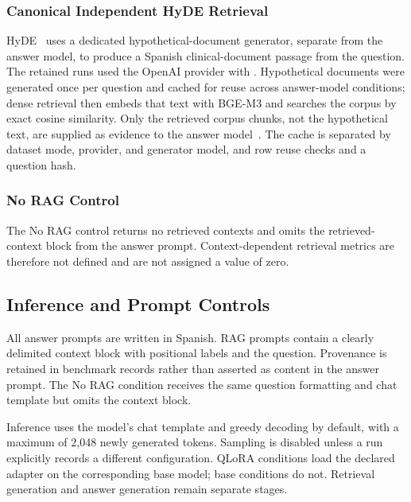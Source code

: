 \subsubsection{Canonical Independent HyDE Retrieval}
HyDE~\cite{gao2023precise} uses a dedicated hypothetical-document
generator, separate from the answer model, to produce a Spanish
clinical-document passage from the question. The retained runs used the
OpenAI provider with . Hypothetical documents
were generated once per question and cached for reuse across answer-model
conditions; dense retrieval then embeds that text with BGE-M3 and searches
the corpus by exact cosine similarity. Only the retrieved corpus chunks,
not the hypothetical text, are supplied as evidence to the answer
model~\cite{ji2023survey}. The cache is separated by dataset mode, provider,
and generator model, and row reuse checks  and a question hash.

\subsubsection{No RAG Control}
The No RAG control returns no retrieved contexts and
omits the retrieved-context block from the answer prompt. Context-dependent
retrieval metrics are therefore not defined and are not assigned a value of
zero.

\subsection{Inference and Prompt Controls}
All answer prompts are written in Spanish. RAG prompts contain a clearly
delimited context block with positional labels and the question. Provenance
is retained in benchmark records rather than asserted as content in the
answer prompt. The No RAG condition receives the same question
formatting and chat template but omits the context block.

Inference uses the model's chat template and greedy decoding by default,
with a maximum of 2,048 newly generated tokens. Sampling is disabled unless a
run explicitly records a different configuration. QLoRA conditions load the
declared adapter on the corresponding base model; base conditions do not.
Retrieval generation and answer generation remain separate stages.

